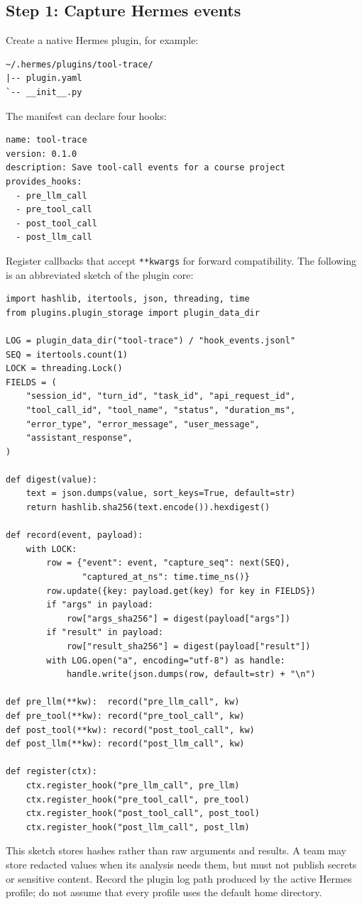\documentclass[11pt]{article}
\begin{document}
\subsection{Step 1: Capture Hermes events}
Create a native Hermes plugin, for example:
\begin{verbatim}
~/.hermes/plugins/tool-trace/
|-- plugin.yaml
`-- __init__.py
\end{verbatim}
The manifest can declare four hooks:
\begin{verbatim}
name: tool-trace
version: 0.1.0
description: Save tool-call events for a course project
provides_hooks:
  - pre_llm_call
  - pre_tool_call
  - post_tool_call
  - post_llm_call
\end{verbatim}
Register callbacks that accept \texttt{**kwargs} for forward compatibility. The following is an abbreviated sketch of the plugin core:
\newpage
\begin{verbatim}
import hashlib, itertools, json, threading, time
from plugins.plugin_storage import plugin_data_dir

LOG = plugin_data_dir("tool-trace") / "hook_events.jsonl"
SEQ = itertools.count(1)
LOCK = threading.Lock()
FIELDS = (
    "session_id", "turn_id", "task_id", "api_request_id",
    "tool_call_id", "tool_name", "status", "duration_ms",
    "error_type", "error_message", "user_message",
    "assistant_response",
)

def digest(value):
    text = json.dumps(value, sort_keys=True, default=str)
    return hashlib.sha256(text.encode()).hexdigest()

def record(event, payload):
    with LOCK:
        row = {"event": event, "capture_seq": next(SEQ),
               "captured_at_ns": time.time_ns()}
        row.update({key: payload.get(key) for key in FIELDS})
        if "args" in payload:
            row["args_sha256"] = digest(payload["args"])
        if "result" in payload:
            row["result_sha256"] = digest(payload["result"])
        with LOG.open("a", encoding="utf-8") as handle:
            handle.write(json.dumps(row, default=str) + "\n")

def pre_llm(**kw):  record("pre_llm_call", kw)
def pre_tool(**kw): record("pre_tool_call", kw)
def post_tool(**kw): record("post_tool_call", kw)
def post_llm(**kw): record("post_llm_call", kw)

def register(ctx):
    ctx.register_hook("pre_llm_call", pre_llm)
    ctx.register_hook("pre_tool_call", pre_tool)
    ctx.register_hook("post_tool_call", post_tool)
    ctx.register_hook("post_llm_call", post_llm)
\end{verbatim}
This sketch stores hashes rather than raw arguments and results. A team may store redacted values when its analysis needs them, but must not publish secrets or sensitive content. Record the plugin log path produced by the active Hermes profile; do not assume that every profile uses the default home directory.
\end{document}
